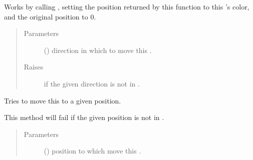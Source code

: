 \documentclass[letterpaper,10pt,english,openany,oneside]{sphinxmanual}
\begin{document}
\begin{fulllineitems}
\begin{fulllineitems}
Works by calling {\hyperref[\detokenize{neutron:neutron.NeutronBoard.furthest_empty_spot}]{}}, setting
the position returned by this function to this {\hyperref[\detokenize{neutron:neutron.Soldier}]{}}’s
color, and the original position to 0.
\begin{quote}\begin{description}
\item[{Parameters}] \leavevmode
{} () \textendash{} direction in which to move this {\hyperref[\detokenize{neutron:neutron.Soldier}]{}}.

\item[{Raises}] \leavevmode
{} \textendash{} if the given direction is not in {\hyperref[\detokenize{neutron:neutron.Soldier.possible_directions}]{}}.

\end{description}\end{quote}

\end{fulllineitems}


\begin{fulllineitems}
\label{\detokenize{neutron:neutron.Soldier.move_to_pos}}
Tries to move this {\hyperref[\detokenize{neutron:neutron.Soldier}]{}} to a given position.

This method will fail if the given position is not in
{\hyperref[\detokenize{neutron:neutron.Soldier.possible_moves}]{}}.
\begin{quote}\begin{description}
\item[{Parameters}] \leavevmode
{} ({\hyperref[\detokenize{util:util.Vec}]{}}) \textendash{} position to which move this {\hyperref[\detokenize{neutron:neutron.Soldier}]{}}.


\end{description}
\end{quote}
\end{fulllineitems}
\end{fulllineitems}
\end{document}
